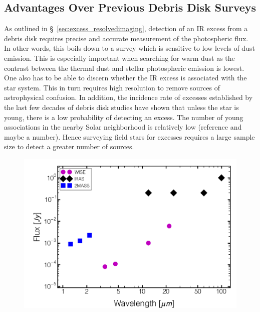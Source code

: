     \subsection{Advantages Over Previous Debris Disk Surveys}

    As outlined in \S~\ref{sec:excess_resolvedimaging}, detection of an IR excess from a debris disk requires precise and accurate measurement of the photospheric flux. In other words, this boils down to a survey which is sensitive to low levels of dust emission. This is especially important when searching for warm dust as the contrast between the thermal dust and stellar photospheric emission is lowest. One also has to be able to discern whether the IR excess is associated with the star system. This in turn requires high resolution to remove sources of astrophysical confusion. In addition, the incidence rate of excesses established by the last few decades of debris disk studies have shown that unless the star is young, there is a low probability of detecting an excess. The number of young associations in the nearby Solar neighborhood is relatively low (reference and maybe a number). Hence surveying field stars for excesses requires a large sample size to detect a greater number of sources. 
    \begin{figure}
    \centering
    \includegraphics[scale=0.5]{Ch2/flux_density_comparison}
    \caption[]{}
    \label{fig:flux_comparison}
    \end{figure}
    

